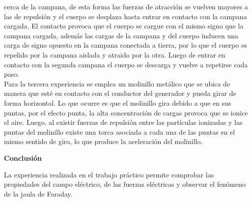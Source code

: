\documentclass[11pt, letterpaper]{article}
\begin{document}
        cerca de la campana, de esta forma las fuerzas de atracción
        se vuelven mayores a las de repulsión y el cuerpo se 
        desplaza hasta entrar en contacto con la campana cargada.
        El contacto provoca que el cuerpo se cargue con el mismo
        signo que la campana cargada, además las cargas de la 
        campana y del cuerpo inducen una carga de signo opuesto en 
        la campana conectada a tierra, por lo que el cuerpo es
        repelido por la campana aislada y atraido por la otra.
        Luego de entrar en contacto con la segunda campana
        el cuerpo se descarga y vuelve a repetirse cada paso.\\
        Para la tercera experiencia se emplea un molinillo 
        metálico que se ubica de manera que esté en contacto
        con el conductor del generador y pueda girar de forma
        horizontal. Lo que ocurre es que el molinillo gira
        debido a que en sus puntas, por el efecto punta,
        la alta concentración de cargas provoca que se 
        ionice el aire. Luego, al existir fuerzas de repulsión
        entre las partículas ionizadas y las puntas del molinillo
        existe una torca asociada a cada una de las puntas en el
        mismo sentido de giro, lo que produce la aceleración del
        molinillo.\\
        
\pagebreak
\begin{center}\textbf{Conclusión}\end{center}
La experiencia realizada en el trabajo práctico permite comprobar
las propiedades del campo eléctrico,  de las fuerzas eléctricas y 
observar el fenómeno de la jaula de Faraday.
\end{document}
